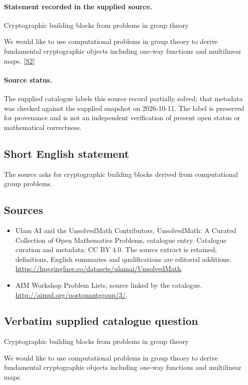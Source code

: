 \documentclass[11pt]{article}
\begin{document}
\paragraph{Statement recorded in the supplied source.}
Cryptographic building blocks from problems in group theory

We would like to use computational problems in group theory to derive fundamental cryptographic objects including one-way functions and multilinear maps. \href{http://aimpl.org/postquantgroup/3/}{[S2]}
\paragraph{Source status.}
The supplied catalogue labels this source record partially solved; that metadata was checked against the supplied snapshot on 2026-10-11. The label is preserved for provenance and is not an independent verification of present open status or mathematical correctness.
\subsection{Short English statement}
The source asks for cryptographic building blocks derived from computational group problems.
\subsection{Sources}
\begin{itemize}
\item[S1] Ulam AI and the UnsolvedMath Contributors, UnsolvedMath: A Curated Collection of Open Mathematics Problems, catalogue entry. Catalogue curation and metadata: CC BY 4.0. The source extract is retained; definitions, English summaries and qualifications are editorial additions.
\url{https://huggingface.co/datasets/ulamai/UnsolvedMath}.
\item[S2] AIM Workshop Problem Lists, source linked by the catalogue.
\url{http://aimpl.org/postquantgroup/3/}.
\end{itemize}
\subsection{Verbatim supplied catalogue question}
Cryptographic building blocks from problems in group theory

We would like to use computational problems in group theory to derive fundamental cryptographic objects including one-way functions and multilinear maps.
\end{document}
